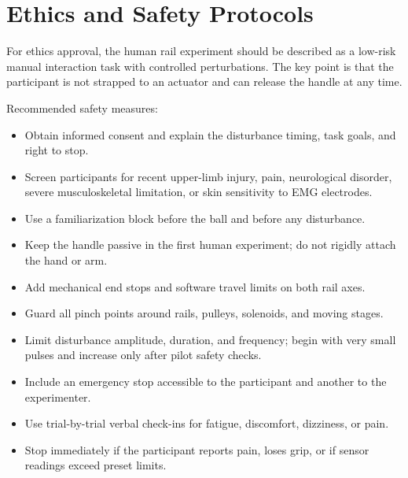 \documentclass[11pt, a4paper]{article}
\begin{document}
\section{Ethics and Safety Protocols}

For ethics approval, the human rail experiment should be described as a low-risk manual interaction task with controlled perturbations. The key point is that the participant is not strapped to an actuator and can release the handle at any time.

Recommended safety measures:

\begin{itemize}[nosep]
  \item Obtain informed consent and explain the disturbance timing, task goals, and right to stop.
  \item Screen participants for recent upper-limb injury, pain, neurological disorder, severe musculoskeletal limitation, or skin sensitivity to EMG electrodes.
  \item Use a familiarization block before the ball and before any disturbance.
  \item Keep the handle passive in the first human experiment; do not rigidly attach the hand or arm.
  \item Add mechanical end stops and software travel limits on both rail axes.
  \item Guard all pinch points around rails, pulleys, solenoids, and moving stages.
  \item Limit disturbance amplitude, duration, and frequency; begin with very small pulses and increase only after pilot safety checks.
  \item Include an emergency stop accessible to the participant and another to the experimenter.
  \item Use trial-by-trial verbal check-ins for fatigue, discomfort, dizziness, or pain.
  \item Stop immediately if the participant reports pain, loses grip, or if sensor readings exceed preset limits.
\end{itemize}
\end{document}
